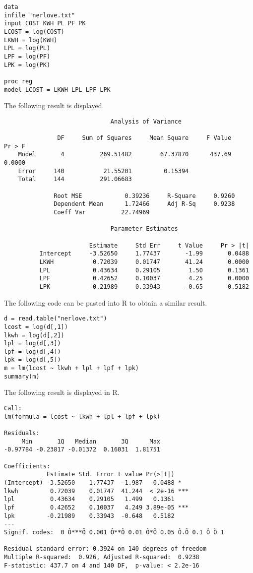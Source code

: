 \documentclass[11pt]{article}
\begin{document}
\begin{Verbatim}
data
infile "nerlove.txt"
input COST KWH PL PF PK
LCOST = log(COST)
LKWH = log(KWH)
LPL = log(PL)
LPF = log(PF)
LPK = log(PK)

proc reg
model LCOST = LKWH LPL LPF LPK
\end{Verbatim}

The following result is displayed.

\begin{Verbatim}
                              Analysis of Variance

               DF     Sum of Squares     Mean Square     F Value     Pr > F
    Model       4          269.51482        67.37870      437.69     0.0000
    Error     140           21.55201         0.15394                       
    Total     144          291.06683                                       

              Root MSE            0.39236     R-Square     0.9260
              Dependent Mean      1.72466     Adj R-Sq     0.9238
              Coeff Var          22.74969                        

                              Parameter Estimates

                        Estimate     Std Err     t Value     Pr > |t|
          Intercept     -3.52650     1.77437       -1.99       0.0488
          LKWH           0.72039     0.01747       41.24       0.0000
          LPL            0.43634     0.29105        1.50       0.1361
          LPF            0.42652     0.10037        4.25       0.0000
          LPK           -0.21989     0.33943       -0.65       0.5182
\end{Verbatim}

The following code can be pasted into R to obtain a similar result.

\begin{Verbatim}
d = read.table("nerlove.txt")
lcost = log(d[,1])
lkwh = log(d[,2])
lpl = log(d[,3])
lpf = log(d[,4])
lpk = log(d[,5])
m = lm(lcost ~ lkwh + lpl + lpf + lpk)
summary(m)
\end{Verbatim}

The following result is displayed in R.

\begin{Verbatim}
Call:
lm(formula = lcost ~ lkwh + lpl + lpf + lpk)

Residuals:
     Min       1Q   Median       3Q      Max 
-0.97784 -0.23817 -0.01372  0.16031  1.81751 

Coefficients:
            Estimate Std. Error t value Pr(>|t|)    
(Intercept) -3.52650    1.77437  -1.987   0.0488 *  
lkwh         0.72039    0.01747  41.244  < 2e-16 ***
lpl          0.43634    0.29105   1.499   0.1361    
lpf          0.42652    0.10037   4.249 3.89e-05 ***
lpk         -0.21989    0.33943  -0.648   0.5182    
---
Signif. codes:  0 Ô***Õ 0.001 Ô**Õ 0.01 Ô*Õ 0.05 Ô.Õ 0.1 Ô Õ 1

Residual standard error: 0.3924 on 140 degrees of freedom
Multiple R-squared:  0.926,	Adjusted R-squared:  0.9238 
F-statistic: 437.7 on 4 and 140 DF,  p-value: < 2.2e-16
\end{Verbatim}
\end{document}
